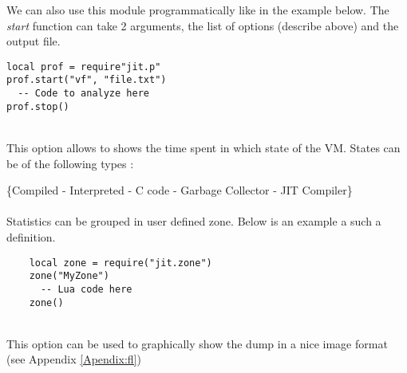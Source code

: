 We can also use this module programmatically like in the example below. The
\emph{start} function can take 2 arguments, the list of options (describe above)
and the output file.
\begin{lstlisting}[style=LuaStyle]
local prof = require"jit.p"
prof.start("vf", "file.txt")
  -- Code to analyze here
prof.stop()
\end{lstlisting}

\\
This option allows to shows the time spent in which state of the VM.
States can be of the following types :

\{Compiled - Interpreted - C code - Garbage Collector - JIT Compiler\} \\

\\
Statistics can be grouped in user defined zone. Below is an example a such a
definition.
\begin{lstlisting}
    local zone = require("jit.zone")
    zone("MyZone")
      -- Lua code here
    zone()
\end{lstlisting}

\\
This option can be used to graphically show the dump in a nice image format
(see Appendix \ref{Apendix:fl})